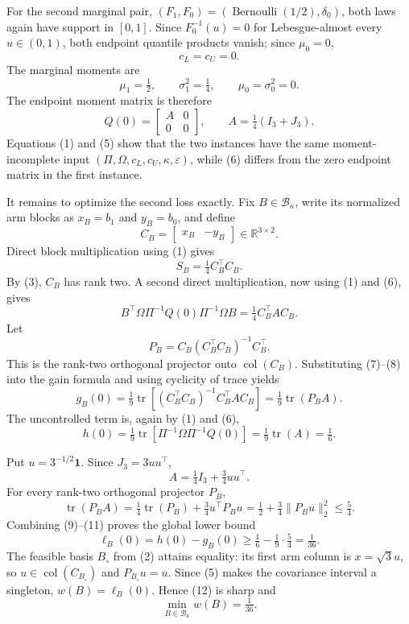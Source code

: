 For the second marginal pair, \((F_1,F_0)=(\operatorname{Bernoulli}(1/2),\delta_0)\), both laws again have support in \([0,1]\). Since \(F_0^{-1}(u)=0\) for Lebesgue-almost every \(u\in(0,1)\), both endpoint quantile products vanish; since \(\mu_0=0\),
\[
c_L=c_U=0.
\tag{5}
\]
The marginal moments are
\[
\mu_1=\tfrac12,
\qquad
\sigma_1^2=\tfrac14,
\qquad
\mu_0=\sigma_0^2=0.
\]
The endpoint moment matrix is therefore
\[
Q(0)=\begin{bmatrix}A&0\\0&0\end{bmatrix},
\qquad
A=\tfrac14(I_3+J_3).
\tag{6}
\]
Equations (1) and (5) show that the two instances have the same moment-incomplete input \((\Pi,\Omega,c_L,c_U,\kappa,\varepsilon)\), while (6) differs from the zero endpoint matrix in the first instance.

It remains to optimize the second loss exactly. Fix \(B\in\mathcal B_\kappa\), write its normalized arm blocks as \(x_B=b_1\) and \(y_B=b_0\), and define
\[
C_B=\begin{bmatrix}x_B&-y_B\end{bmatrix}\in\mathbb R^{3\times2}.
\]
Direct block multiplication using (1) gives
\[
S_B=\tfrac14C_B^{\top}C_B.
\tag{7}
\]
By (3), \(C_B\) has rank two. A second direct multiplication, now using (1) and (6), gives
\[
B^{\top}\Omega\Pi^{-1}Q(0)\Pi^{-1}\Omega B
=\tfrac14C_B^{\top}AC_B.
\tag{8}
\]
Let
\[
P_B=C_B(C_B^{\top}C_B)^{-1}C_B^{\top}.
\]
This is the rank-two orthogonal projector onto \(\operatorname{col}(C_B)\). Substituting (7)--(8) into the gain formula and using cyclicity of trace yields
\[
g_B(0)
=\tfrac19\operatorname{tr}\!\left[(C_B^{\top}C_B)^{-1}C_B^{\top}AC_B\right]
=\tfrac19\operatorname{tr}(P_BA).
\tag{9}
\]
The uncontrolled term is, again by (1) and (6),
\[
h(0)
=\tfrac19\operatorname{tr}\!\left[\Pi^{-1}\Omega\Pi^{-1}Q(0)\right]
=\tfrac19\operatorname{tr}(A)
=\tfrac16.
\tag{10}
\]

Put \(u=3^{-1/2}\mathbf1\). Since \(J_3=3uu^{\top}\),
\[
A=\tfrac14I_3+\tfrac34uu^{\top}.
\]
For every rank-two orthogonal projector \(P_B\),
\[
\operatorname{tr}(P_BA)
=\tfrac14\operatorname{tr}(P_B)+\tfrac34u^{\top}P_Bu
=\tfrac12+\tfrac34\lVert P_Bu\rVert_2^2
\le\tfrac54.
\tag{11}
\]
Combining (9)--(11) proves the global lower bound
\[
\ell_B(0)=h(0)-g_B(0)
\ge\tfrac16-\tfrac19\cdot\tfrac54
=\tfrac1{36}.
\tag{12}
\]
The feasible basis \(B_\circ\) from (2) attains equality: its first arm column is \(x=\sqrt3u\), so \(u\in\operatorname{col}(C_{B_\circ})\) and \(P_{B_\circ}u=u\). Since (5) makes the covariance interval a singleton, \(w(B)=\ell_B(0)\). Hence (12) is sharp and
\[
\min_{B\in\mathcal B_\kappa}w(B)=\tfrac1{36}.
\tag{13}
\]

